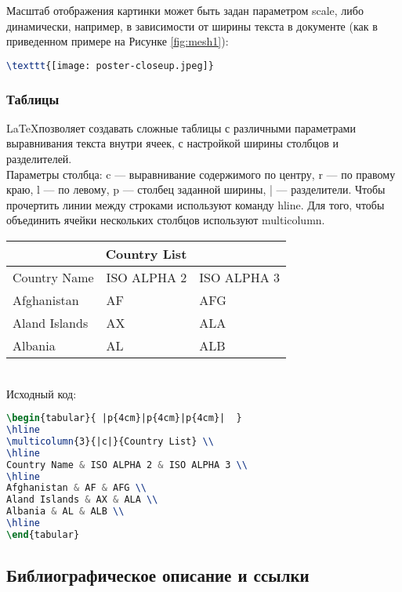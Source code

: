 \documentclass[a4paper]{article}
\begin{document}
Масштаб отображения картинки может быть задан параметром scale, либо динамически, например, в зависимости от ширины текста в документе (как в приведенном примере на Рисунке \ref{fig:mesh1}): \begin{lstlisting}[language=TeX] 
\texttt{[image: poster-closeup.jpeg]}
\end{lstlisting}
\thispagestyle{empty}
\newpage
\subsubsection{Таблицы}
\LaTeX позволяет создавать сложные таблицы с различными параметрами выравнивания текста внутри ячеек, с настройкой ширины столбцов и разделителей.
\hfill\break
\\Параметры столбца: c — выравнивание содержимого по центру, r — по правому краю, l — по левому, p — столбец заданной ширины, | — разделители.
Чтобы прочертить линии между строками используют команду hline. Для того, чтобы объединить ячейки нескольких столбцов используют multicolumn. \\
\hfill\break
\begin{tabular}{ |p{4cm}|p{4cm}|p{4cm}|  }
\hline
\multicolumn{3}{|c|}{Country List} \\
\hline
Country Name & ISO ALPHA 2 & ISO ALPHA 3 \\
\hline
Afghanistan & AF & AFG \\
Aland Islands & AX & ALA \\
Albania & AL & ALB \\
\hline
\end{tabular}
\hfill\break
\\Исходный код:
\begin{lstlisting}[language=TeX] 
\begin{tabular}{ |p{4cm}|p{4cm}|p{4cm}|  }
\hline
\multicolumn{3}{|c|}{Country List} \\
\hline
Country Name & ISO ALPHA 2 & ISO ALPHA 3 \\
\hline
Afghanistan & AF & AFG \\
Aland Islands & AX & ALA \\
Albania & AL & ALB \\
\hline
\end{tabular}
\end{lstlisting}
\thispagestyle{empty}
\newpage
\subsection{Библиографическое описание и ссылки}
\end{document}
